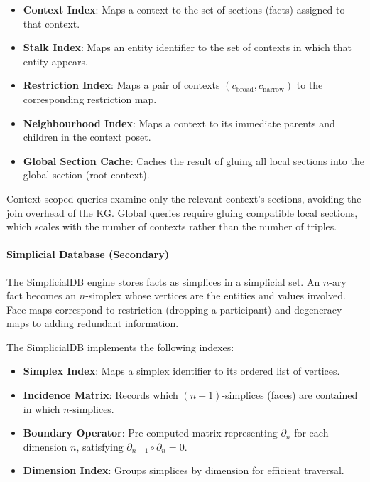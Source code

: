 \begin{itemize}
    \item \textbf{Context Index}: Maps a context to the set of sections
        (facts) assigned to that context.
    \item \textbf{Stalk Index}: Maps an entity identifier to the set of
        contexts in which that entity appears.
    \item \textbf{Restriction Index}: Maps a pair of contexts
        $(c_{\text{broad}}, c_{\text{narrow}})$ to the corresponding
        restriction map.
    \item \textbf{Neighbourhood Index}: Maps a context to its immediate
        parents and children in the context poset.
    \item \textbf{Global Section Cache}: Caches the result of gluing all
        local sections into the global section (root context).
\end{itemize}

Context-scoped queries examine only the relevant context's sections,
avoiding the join overhead of the KG.  Global queries require gluing
compatible local sections, which scales with the number of contexts
rather than the number of triples.

\paragraph{Simplicial Database (Secondary)}

The SimplicialDB engine stores facts as simplices in a simplicial set.
An $n$-ary fact becomes an $n$-simplex whose vertices are the entities
and values involved.  Face maps correspond to restriction (dropping a
participant) and degeneracy maps to adding redundant information.

The SimplicialDB implements the following indexes:

\begin{itemize}
    \item \textbf{Simplex Index}: Maps a simplex identifier to its
        ordered list of vertices.
    \item \textbf{Incidence Matrix}: Records which $(n-1)$-simplices
        (faces) are contained in which $n$-simplices.
    \item \textbf{Boundary Operator}: Pre-computed matrix representing
        $\partial_n$ for each dimension $n$, satisfying
        $\partial_{n-1} \circ \partial_n = 0$.
    \item \textbf{Dimension Index}: Groups simplices by dimension for
        efficient traversal.
\end{itemize}

